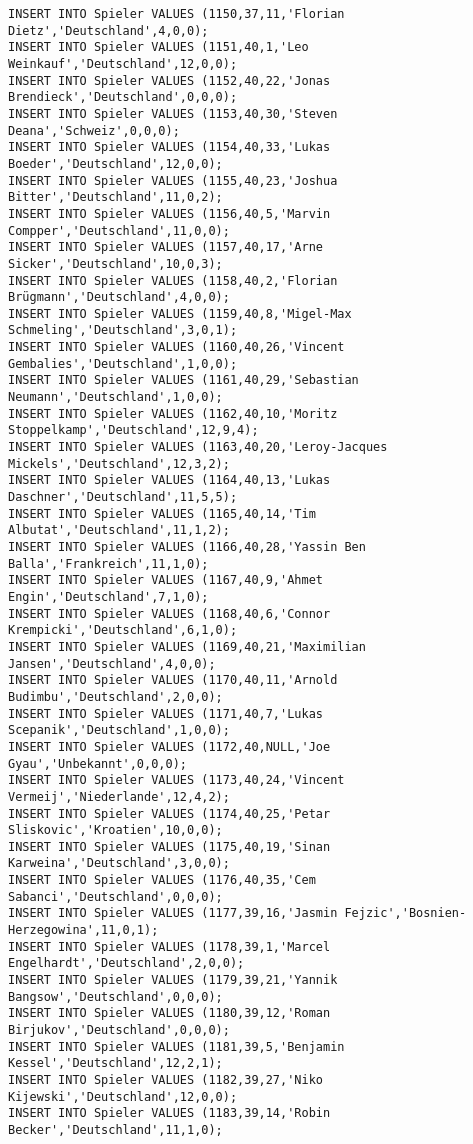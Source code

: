 \documentclass{bschlangaul-aufgabe}
\begin{document}
\begin{verbatim}
INSERT INTO Spieler VALUES (1150,37,11,'Florian Dietz','Deutschland',4,0,0);
INSERT INTO Spieler VALUES (1151,40,1,'Leo Weinkauf','Deutschland',12,0,0);
INSERT INTO Spieler VALUES (1152,40,22,'Jonas Brendieck','Deutschland',0,0,0);
INSERT INTO Spieler VALUES (1153,40,30,'Steven Deana','Schweiz',0,0,0);
INSERT INTO Spieler VALUES (1154,40,33,'Lukas Boeder','Deutschland',12,0,0);
INSERT INTO Spieler VALUES (1155,40,23,'Joshua Bitter','Deutschland',11,0,2);
INSERT INTO Spieler VALUES (1156,40,5,'Marvin Compper','Deutschland',11,0,0);
INSERT INTO Spieler VALUES (1157,40,17,'Arne Sicker','Deutschland',10,0,3);
INSERT INTO Spieler VALUES (1158,40,2,'Florian Brügmann','Deutschland',4,0,0);
INSERT INTO Spieler VALUES (1159,40,8,'Migel-Max Schmeling','Deutschland',3,0,1);
INSERT INTO Spieler VALUES (1160,40,26,'Vincent Gembalies','Deutschland',1,0,0);
INSERT INTO Spieler VALUES (1161,40,29,'Sebastian Neumann','Deutschland',1,0,0);
INSERT INTO Spieler VALUES (1162,40,10,'Moritz Stoppelkamp','Deutschland',12,9,4);
INSERT INTO Spieler VALUES (1163,40,20,'Leroy-Jacques Mickels','Deutschland',12,3,2);
INSERT INTO Spieler VALUES (1164,40,13,'Lukas Daschner','Deutschland',11,5,5);
INSERT INTO Spieler VALUES (1165,40,14,'Tim Albutat','Deutschland',11,1,2);
INSERT INTO Spieler VALUES (1166,40,28,'Yassin Ben Balla','Frankreich',11,1,0);
INSERT INTO Spieler VALUES (1167,40,9,'Ahmet Engin','Deutschland',7,1,0);
INSERT INTO Spieler VALUES (1168,40,6,'Connor Krempicki','Deutschland',6,1,0);
INSERT INTO Spieler VALUES (1169,40,21,'Maximilian Jansen','Deutschland',4,0,0);
INSERT INTO Spieler VALUES (1170,40,11,'Arnold Budimbu','Deutschland',2,0,0);
INSERT INTO Spieler VALUES (1171,40,7,'Lukas Scepanik','Deutschland',1,0,0);
INSERT INTO Spieler VALUES (1172,40,NULL,'Joe Gyau','Unbekannt',0,0,0);
INSERT INTO Spieler VALUES (1173,40,24,'Vincent Vermeij','Niederlande',12,4,2);
INSERT INTO Spieler VALUES (1174,40,25,'Petar Sliskovic','Kroatien',10,0,0);
INSERT INTO Spieler VALUES (1175,40,19,'Sinan Karweina','Deutschland',3,0,0);
INSERT INTO Spieler VALUES (1176,40,35,'Cem Sabanci','Deutschland',0,0,0);
INSERT INTO Spieler VALUES (1177,39,16,'Jasmin Fejzic','Bosnien-Herzegowina',11,0,1);
INSERT INTO Spieler VALUES (1178,39,1,'Marcel Engelhardt','Deutschland',2,0,0);
INSERT INTO Spieler VALUES (1179,39,21,'Yannik Bangsow','Deutschland',0,0,0);
INSERT INTO Spieler VALUES (1180,39,12,'Roman Birjukov','Deutschland',0,0,0);
INSERT INTO Spieler VALUES (1181,39,5,'Benjamin Kessel','Deutschland',12,2,1);
INSERT INTO Spieler VALUES (1182,39,27,'Niko Kijewski','Deutschland',12,0,0);
INSERT INTO Spieler VALUES (1183,39,14,'Robin Becker','Deutschland',11,1,0);

\end{verbatim}
\end{document}
